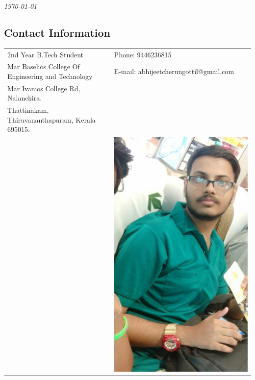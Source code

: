 \documentclass[margin,line]{res}
\begin{document}
	
	 \hfill {\em \today}
	
	\begin{resume}
		\section{\sc Contact Information}
		
		\vspace{.05in}
		\begin{tabular}{@{}p{3.5in}p{3in}}
			2nd  Year B.Tech Student                                                                     & {Phone:}  9446236815 \\
			Mar Baselios College Of Engineering
			and Technology 
			& {E-mail:}  abhijeetcherungottil@gmail.com\\
			Mar Ivanios College Rd, Nalanchira.\\
			Thattinakam, Thiruvananthapuram, Kerala 695015.\\ 
			&
			\includegraphics[width=0.1\textheight]{my}
			

\end{tabular}
\end{resume}
\end{document}
